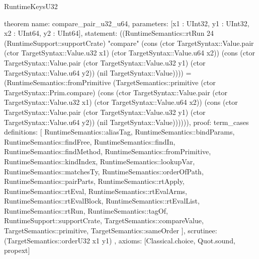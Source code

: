 \begin{lexlean}{RuntimeKeysU32}
\begin{semanticmodule}
theorem{
  name: compare_pair_u32_u64,
  parameters: [x1 : UInt32, y1 : UInt32, x2 : UInt64, y2 : UInt64],
  statement: ((RuntimeSemantics::rtRun 24 (RuntimeSupport::supportCrate) "compare" (cons (ctor TargetSyntax::Value.pair (ctor TargetSyntax::Value.u32 x1) (ctor TargetSyntax::Value.u64 x2)) (cons (ctor TargetSyntax::Value.pair (ctor TargetSyntax::Value.u32 y1) (ctor TargetSyntax::Value.u64 y2)) (nil TargetSyntax::Value)))) = (RuntimeSemantics::fromPrimitive (TargetSemantics::primitive (ctor TargetSyntax::Prim.compare) (cons (ctor TargetSyntax::Value.pair (ctor TargetSyntax::Value.u32 x1) (ctor TargetSyntax::Value.u64 x2)) (cons (ctor TargetSyntax::Value.pair (ctor TargetSyntax::Value.u32 y1) (ctor TargetSyntax::Value.u64 y2)) (nil TargetSyntax::Value)))))),
  proof: term_cases{
    definitions: [
      RuntimeSemantics::aliasTag,
      RuntimeSemantics::bindParams,
      RuntimeSemantics::findFree,
      RuntimeSemantics::findIn,
      RuntimeSemantics::findMethod,
      RuntimeSemantics::fromPrimitive,
      RuntimeSemantics::kindIndex,
      RuntimeSemantics::lookupVar,
      RuntimeSemantics::matchesTy,
      RuntimeSemantics::orderOfPath,
      RuntimeSemantics::pairParts,
      RuntimeSemantics::rtApply,
      RuntimeSemantics::rtEval,
      RuntimeSemantics::rtEvalArms,
      RuntimeSemantics::rtEvalBlock,
      RuntimeSemantics::rtEvalList,
      RuntimeSemantics::rtRun,
      RuntimeSemantics::tagOf,
      RuntimeSupport::supportCrate,
      TargetSemantics::compareValue,
      TargetSemantics::primitive,
      TargetSemantics::sameOrder
    ],
    scrutinee: (TargetSemantics::orderU32 x1 y1)
  },
  axioms: [Classical.choice, Quot.sound, propext]
}


\end{semanticmodule}
\end{lexlean}
